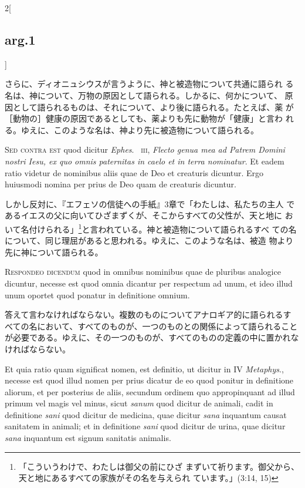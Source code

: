 \documentclass[paper=a4paper,fontsize=10pt,jafontsize=9pt,titlepage]{jlreq}
\begin{document}
\begin{paracol}{2}[\subsection{arg.1}]
\switchcolumn

さらに、ディオニュシウスが言うように、神と被造物について共通に語られ
る名は、神について、万物の原因として語られる。しかるに、何かについて、
原因として語られるものは、それについて、より後に語られる。たとえば、薬
が［動物の］健康の原因であるとしても、薬よりも先に動物が「健康」と言わ
れる。ゆえに、このような名は、神より先に被造物について語られる。

\switchcolumn*[\subsection{s.c.}]

{\scshape Sed contra est} quod dicitur {\itshape Ephes}.~{\scshape
iii}, {\itshape Flecto genua mea ad Patrem Domini nostri Iesu, ex quo
omnis paternitas in caelo et in terra nominatur}. Et eadem ratio
videtur de nominibus aliis quae de Deo et creaturis dicuntur. Ergo
huiusmodi nomina per prius de Deo quam de creaturis dicuntur.

\switchcolumn

しかし反対に、『エフェソの信徒への手紙』3章で「わたしは、私たちの主人
であるイエスの父に向いてひざまずくが、そこからすべての父性が、天と地に
おいて名付けられる」\footnote{「こういうわけで、わたしは御父の前にひざ
まずいて祈ります。御父から、天と地にあるすべての家族がその名を与えられ
ています。」(3:14, 15) }と言われている。神と被造物について語られるすべ
ての名について、同じ理屈があると思われる。ゆえに、このような名は、被造
物より先に神について語られる。


{\scshape Respondeo dicendum} quod in omnibus nominibus quae de
pluribus analogice dicuntur, necesse est quod omnia dicantur per
respectum ad unum, et ideo illud unum oportet quod ponatur in
definitione omnium.

\switchcolumn

答えて言わなければならない。複数のものについてアナロギア的に語られるす
べての名において、すべてのものが、一つのものとの関係によって語られること
が必要である。ゆえに、その一つのものが、すべてのものの定義の中に置かれな
ければならない。

\switchcolumn*

Et quia ratio quam significat nomen, est definitio, ut dicitur in IV
{\itshape Metaphys}., necesse est quod illud nomen per prius dicatur
de eo quod ponitur in definitione aliorum, et per posterius de aliis,
secundum ordinem quo appropinquant ad illud primum vel magis vel
minus, sicut {\itshape sanum} quod dicitur de animali, cadit in
definitione {\itshape sani} quod dicitur de medicina, quae dicitur
{\itshape sana} inquantum causat sanitatem in animali; et in
definitione {\itshape sani} quod dicitur de urina, quae dicitur
{\itshape sana} inquantum est signum sanitatis animalis.


\end{paracol}
\end{document}
